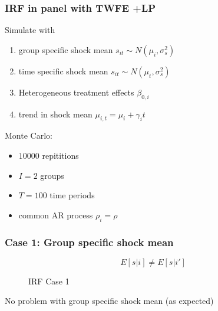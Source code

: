 \documentclass[notes,11pt, aspectratio = 169]{beamer}
\begin{document}
\begin{frame}\frametitle{IRF in panel with TWFE +LP}

    \begin{wideitemize} 
        \item Simulate with  
        \begin{enumerate}
            \item group specific shock mean $s_{it} \sim N(\mu_i, \sigma_s^2)$
            \item time specific shock mean $s_{it} \sim N(\mu_t, \sigma_s^2)$
            \item Heterogeneous treatment effects $\beta_{0,i}$ 
            \item trend in shock mean $\mu_{i,t} = \mu_i + \gamma_i t$ 
        \end{enumerate}
        \item Monte Carlo: 
            \begin{itemize}
                \item $10 000$ repititions 
                \item $I = 2$ groups
                \item $T = 100$ time periods
                \item common AR process $\rho_i=\rho$
            \end{itemize}
    \end{wideitemize}

\end{frame}

  

\begin{frame}
    \frametitle{Case 1: Group specific shock mean}
    \[E[s|i] \neq E[s|i'] \] 
    
    
\begin{figure}
    \centering
  \caption{IRF Case 1}
  \end{figure}
  
  No problem with group specific shock mean (as expected)
  
\end{frame}
\end{document}
